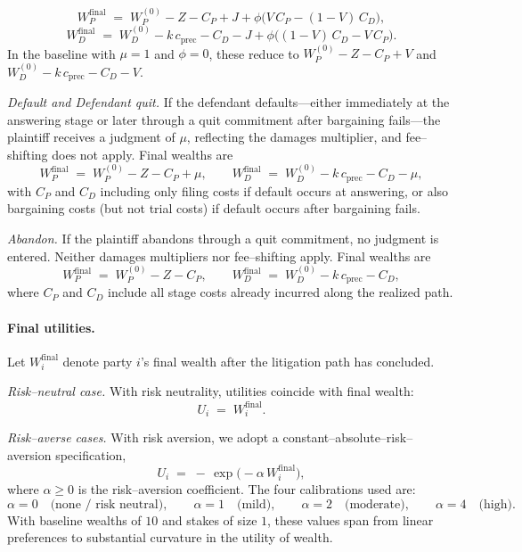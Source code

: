 \documentclass{article}
\begin{document}
\[
W_P^{\mathrm{final}}
\;=\;
W_P^{(0)} - Z - C_P + J + \phi\bigl(V\,C_P - (1-V)\,C_D\bigr),
\]
\[
W_D^{\mathrm{final}}
\;=\;
W_D^{(0)} - k\,c_{\mathrm{prec}} - C_D - J + \phi\bigl((1-V)\,C_D - V\,C_P\bigr).
\]
In the baseline with $\mu=1$ and $\phi=0$, these reduce to $W_P^{(0)}-Z-C_P+V$ and $W_D^{(0)}-k\,c_{\mathrm{prec}}-C_D-V$.

\emph{Default and Defendant quit.} If the defendant defaults—either immediately at the answering stage or later through a quit commitment after bargaining fails—the plaintiff receives a judgment of $\mu$, reflecting the damages multiplier, and fee–shifting does not apply. Final wealths are
\[
W_P^{\mathrm{final}} \;=\; W_P^{(0)} - Z - C_P + \mu,
\qquad
W_D^{\mathrm{final}} \;=\; W_D^{(0)} - k\,c_{\mathrm{prec}} - C_D - \mu,
\]
with $C_P$ and $C_D$ including only filing costs if default occurs at answering, or also bargaining costs (but not trial costs) if default occurs after bargaining fails.

\emph{Abandon.} If the plaintiff abandons through a quit commitment, no judgment is entered. Neither damages multipliers nor fee–shifting apply. Final wealths are
\[
W_P^{\mathrm{final}} \;=\; W_P^{(0)} - Z - C_P,
\qquad
W_D^{\mathrm{final}} \;=\; W_D^{(0)} - k\,c_{\mathrm{prec}} - C_D,
\]
where $C_P$ and $C_D$ include all stage costs already incurred along the realized path.

\paragraph{Final utilities.}
Let $W_i^{\mathrm{final}}$ denote party $i$'s final wealth after the litigation path has concluded.

\emph{Risk–neutral case.} With risk neutrality, utilities coincide with final wealth:
\[
U_i \;=\; W_i^{\mathrm{final}}.
\]

\emph{Risk–averse cases.} With risk aversion, we adopt a constant–absolute–risk–aversion specification,
\[
U_i \;=\; -\,\exp\!\bigl(-\alpha\,W_i^{\mathrm{final}}\bigr),
\]
where $\alpha\ge 0$ is the risk–aversion coefficient. The four calibrations used are:
\[
\alpha = 0 \quad\text{(none / risk neutral)},\qquad
\alpha = 1 \quad\text{(mild)},\qquad
\alpha = 2 \quad\text{(moderate)},\qquad
\alpha = 4 \quad\text{(high)}.
\]
With baseline wealths of $10$ and stakes of size $1$, these values span from linear preferences to substantial curvature in the utility of wealth.
\end{document}
